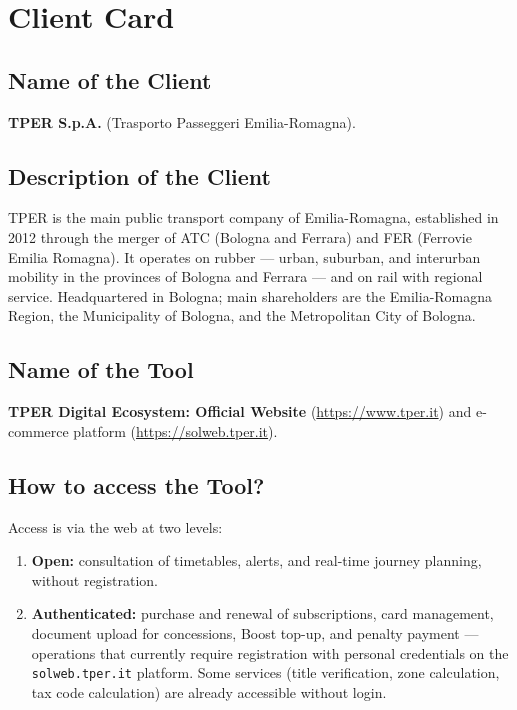 ﻿\documentclass[11pt,a4paper]{article}
\begin{document}
\vspace{0.4cm}

\section{Client Card}

\subsection{Name of the Client}
\textbf{TPER S.p.A.} (Trasporto Passeggeri Emilia-Romagna).

\subsection{Description of the Client}
TPER is the main public transport company of Emilia-Romagna,
established in 2012 through the merger of ATC (Bologna and Ferrara) and FER
(Ferrovie Emilia Romagna). It operates on rubber --- urban, suburban, and
interurban mobility in the provinces of Bologna and Ferrara --- and on rail
with regional service. Headquartered in Bologna; main shareholders are
the Emilia-Romagna Region, the Municipality of Bologna, and the Metropolitan
City of Bologna.

\subsection{Name of the Tool}
\textbf{TPER Digital Ecosystem: Official Website}
(\url{https://www.tper.it}) and e-commerce platform
(\url{https://solweb.tper.it}).

\subsection{How to access the Tool?}
Access is via the web at two levels:
\begin{enumerate}[leftmargin=*]
    \item \textbf{Open:} consultation of timetables, alerts, and real-time
    journey planning, without registration.
    \item \textbf{Authenticated:} purchase and renewal of subscriptions,
    card management, document upload for concessions, Boost top-up, and
    penalty payment --- operations that currently require registration
    with personal credentials on the \texttt{solweb.tper.it} platform.
    Some services (title verification, zone calculation, tax code
    calculation) are already accessible without login.
\end{enumerate}
\end{document}
